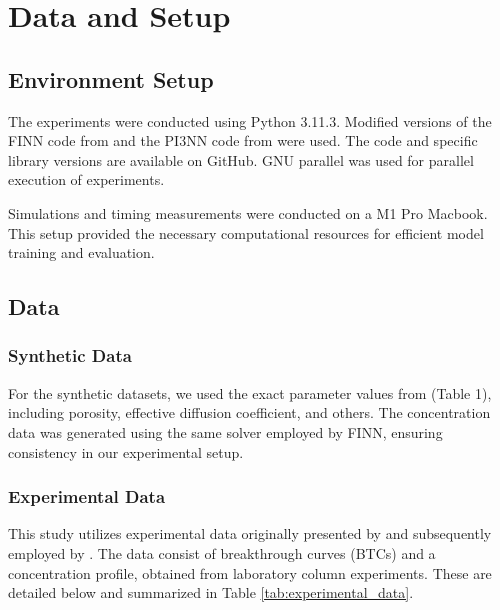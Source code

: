 \section{Data and Setup}
\subsection{Environment Setup}
The experiments were conducted using Python 3.11.3. Modified versions of the FINN code from \cite{finn} and the PI3NN code from \cite{pi3nn} were used. The code and specific library versions are available on GitHub. GNU parallel \cite{tange_2023_10199085} was used for parallel execution of experiments. %

Simulations and timing measurements were conducted on a M1 Pro Macbook. This setup provided the necessary computational resources for efficient model training and evaluation.


\subsection{Data}
\subsubsection{Synthetic Data}
\label{sec:synthetic_data}
For the synthetic datasets, we used the exact parameter values from \cite{finn} (Table 1), including porosity, effective diffusion coefficient, and others. The concentration data was generated using the same solver employed by FINN, ensuring consistency in our experimental setup.


\subsubsection{Experimental Data}
\label{sec:experimental_data}

This study utilizes experimental data originally presented by \cite{nowak2016entropy} and subsequently employed by \cite{finn}. The data consist of breakthrough curves (BTCs) and a concentration profile, obtained from laboratory column experiments. These are detailed below and summarized in Table \vref{tab:experimental_data}.

